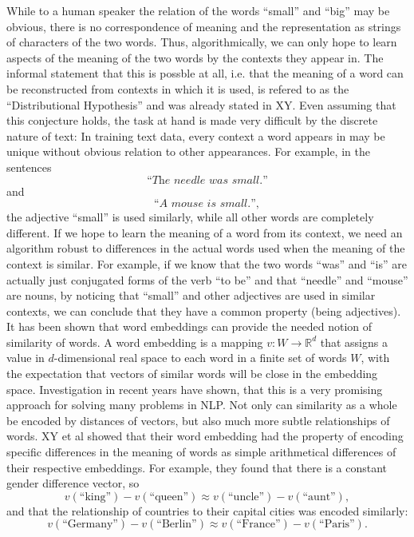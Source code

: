 \documentclass{amsart}
\theoremstyle{plain}
\theoremstyle{definition}
\newcommand{\R}{\mathbb{R}}
\begin{document}
While to a human speaker the relation of the words ``small'' and ``big'' may be obvious, there is no correspondence of meaning and the representation as strings of characters of the two words.
Thus, algorithmically, we can only hope to learn aspects of the meaning of the two words by the contexts they appear in.
The informal statement that this is possble at all, i.e. that the meaning of a word can be reconstructed from contexts in which it is used, is refered to as the ``Distributional Hypothesis'' and was already stated in XY.
Even assuming that this conjecture holds, the task at hand is made very difficult by the discrete nature of text:
In training text data, every context a word appears in may be unique without obvious relation to other appearances.
For example, in the sentences
\begin{equation*}
  \textit{``The needle was small.''}
\end{equation*}
and
\begin{equation*}
  \textit{``A mouse is small.''},
\end{equation*}
the adjective ``small'' is used similarly, while all other words are completely different.
If we hope to learn the meaning of a word from its context, we need an algorithm robust to differences in the actual words used when the meaning of the context is similar.
For example, if we know that the two words ``was'' and ``is'' are actually just conjugated forms of the verb ``to be'' and that ``needle'' and ``mouse'' are nouns, by noticing that ``small'' and other adjectives are used in similar contexts, we can conclude that they have a common property (being adjectives).
It has been shown that word embeddings can provide the needed notion of similarity of words.
A word embedding is a mapping $v : W \rightarrow \R^d$ that assigns a value in $d$-dimensional real space to each word in a finite set of words $W$, with the expectation that vectors of similar words will be close in the embedding space.
Investigation in recent years have shown, that this is a very promising approach for solving many problems in NLP.
Not only can similarity as a whole be encoded by distances of vectors, but also much more subtle relationships of words.
XY et al showed that their word embedding had the property of encoding specific differences in the meaning of words as simple arithmetical differences of their respective embeddings.
For example, they found that there is a constant gender difference vector, so
\begin{equation*}
  v(\text{``king''}) - v(\text{``queen''}) \approx v(\text{``uncle''}) - v(\text{``aunt''}),
\end{equation*}
and that the relationship of countries to their capital cities was encoded similarly:
\begin{equation*}
  v(\text{``Germany''}) - v(\text{``Berlin''}) \approx v(\text{``France''}) - v(\text{``Paris''}).
\end{equation*}
\end{document}
